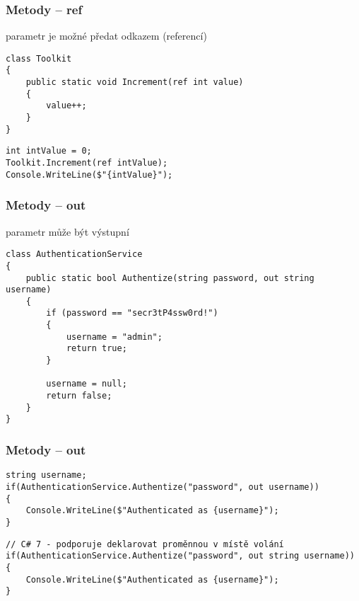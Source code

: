 \begin{frame}[fragile]
\frametitle{Metody -- ref}
\begin{bitemize}{}
\item parametr je možné předat odkazem (referencí)
\end{bitemize}

\begin{yesblock}
\begin{lstlisting}[basicstyle=\small]
class Toolkit
{
    public static void Increment(ref int value)
    {
	    value++;
    }
}
\end{lstlisting}
\end{yesblock}

\begin{yesblock}
\begin{lstlisting}[basicstyle=\small]
int intValue = 0;
Toolkit.Increment(ref intValue);
Console.WriteLine($"{intValue}");
\end{lstlisting}
\end{yesblock}
\end{frame}



\begin{frame}[fragile]
\frametitle{Metody -- out}
\begin{bitemize}{}
\item parametr může být výstupní
\end{bitemize}

\begin{yesblock}
\begin{lstlisting}[basicstyle=\small]
class AuthenticationService
{
    public static bool Authentize(string password, out string username)
    {
        if (password == "secr3tP4ssw0rd!")
        {
            username = "admin";
            return true;
        }

        username = null;
        return false;
    }
}
\end{lstlisting}
\end{yesblock}
\end{frame}

\begin{frame}[fragile]
\frametitle{Metody -- out}

\begin{yesblock}
\begin{lstlisting}[basicstyle=\small]
string username;
if(AuthenticationService.Authentize("password", out username))
{
    Console.WriteLine($"Authenticated as {username}");
}
\end{lstlisting}
\end{yesblock}

\begin{yesblock}
\begin{lstlisting}[basicstyle=\small]
// C# 7 - podporuje deklarovat proměnnou v místě volání
if(AuthenticationService.Authentize("password", out string username))
{
    Console.WriteLine($"Authenticated as {username}");
}
\end{lstlisting}
\end{yesblock}
\end{frame}







